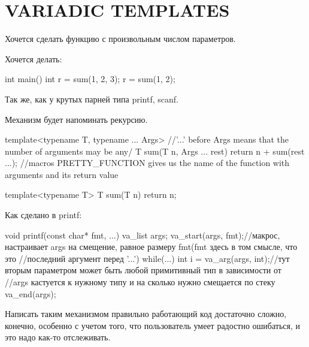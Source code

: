 \section{VARIADIC TEMPLATES}

Хочется сделать функцию с произвольным числом параметров.

Хочется делать:
\begin{cppcode}
int main() {
        int r = sum(1, 2, 3);
        r = sum(1, 2);
}
\end{cppcode}

Так же, как у крутых парней типа printf, scanf.

Механизм будет напоминать рекурсию.

\begin{cppcode}
template<typename T, typename ... Args> //'...' before Args means that the number of arguments may be any/
T sum(T n, Args ... rest) {
	return n + sum(rest ...);
}//macros PRETTY_FUNCTION gives us the name of the function with arguments and its return value

template<typename T>
T sum(T n) {
	return n;
}
\end{cppcode}


Как сделано в printf:

\begin{cppcode}
void printf(const char* fmt, ...) {
	va_list args;
	va_start(args, fmt);//макрос, настраивает args на смещение, равное размеру fmt(fmt здесь в том смысле, что это
						//последний аргумент перед '...')
	while(...) {
		int i = va_arg(args, int);//тут вторым параметром может быть любой примитивный тип в зависимости от %
								  //args кастуется к нужному типу и на сколько нужно смещается по стеку
	}
	va_end(args);
}
\end{cppcode}

Написать таким механизмом правильно работающий код достаточно сложно, конечно, особенно с учетом того, 
что пользователь умеет радостно ошибаться, и это надо как-то отслеживать.
